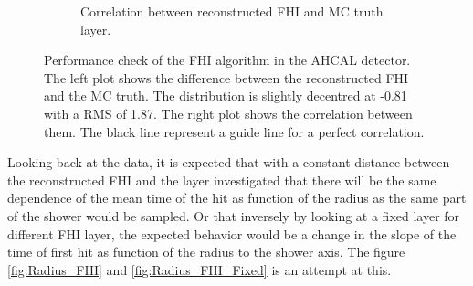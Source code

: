 \begin{figure}[htbp!]
\begin{subfigure}[t]{0.5\textwidth}
		\caption{Correlation between reconstructed FHI and MC truth layer.}\label{fig:Corr_FHI_RecoMC}
	\end{subfigure}
	\caption{Performance check of the FHI algorithm in the AHCAL detector. The left plot shows the difference between the reconstructed FHI and the MC truth. The distribution is slightly decentred at -0.81 with a RMS of 1.87. The right plot shows the correlation between them. The black line represent a guide line for a perfect correlation.}
	\label{fig:FHIAlgo}
\end{figure}

Looking back at the data, it is expected that with a constant distance between the reconstructed FHI and the layer investigated that there will be the same dependence of the mean time of the hit as function of the radius as the same part of the shower would be sampled. Or that inversely by looking at a fixed layer for different FHI layer, the expected behavior would be a change in the slope of the time of first hit as function of the radius to the shower axis. The figure \ref{fig:Radius_FHI} and \ref{fig:Radius_FHI_Fixed} is an attempt at this.

